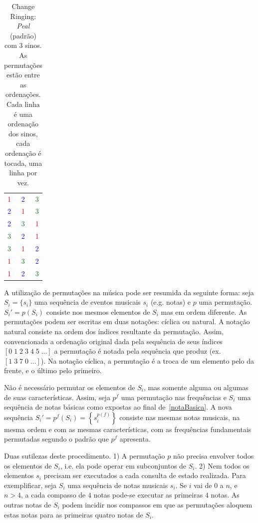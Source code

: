 \begin{table}[htpq!]
\centering
\caption{Change Ringing: \emph{Peal} (padrão) com 3 sinos. As permutações estão entre as ordenações. Cada linha é uma ordenação dos sinos, cada ordenação é tocada, uma linha por vez.}
\begin{tabular}{l c r}
\textcolor{red}{1} & \textcolor{blue}{2} & \textcolor{green}{3} \\
\textcolor{blue}{2} & \textcolor{red}{1} & \textcolor{green}{3} \\
\textcolor{blue}{2} & \textcolor{green}{3} & \textcolor{red}{1} \\
\textcolor{green}{3} & \textcolor{blue}{2} & \textcolor{red}{1} \\
\textcolor{green}{3} & \textcolor{red}{1} & \textcolor{blue}{2} \\
\textcolor{red}{1} & \textcolor{green}{3} & \textcolor{blue}{2} \\
\textcolor{red}{1} & \textcolor{blue}{2} & \textcolor{green}{3}
\end{tabular}
\label{tab:change}
\end{table}


A utilização de permutações na música pode ser resumida da seguinte forma:
seja $S_i=\{s_i\}$ uma sequência de eventos musicais $s_i$ (e.g. notas) e $p$ uma permutação.
$S_i'=p(S_i)$ consiste nos mesmos elementos de $S_i$ mas em ordem diferente.
As permutações podem ser escritas em duas notações: cíclica ou natural. 
A notação natural consiste na ordem dos índices 
resultante da permutação. Assim,
convencionada a ordenação original dada pela sequência de seus índices $[0\;1\;2\;3\;4\;5\;...]$ a permutação é notada pela sequência que produz (ex. $[1\;3\;7\;0\;...]$). Na notação cíclica, a permutação é a troca de um elemento pelo
da frente, e o último pelo primeiro.

Não é necessário permutar os elementos de $S_i$, mas somente
alguma ou algumas de suas características. Assim, seja $p^f$ uma permutação 
nas frequências e $S_i$ uma sequência de notas básicas como expostas
ao final de~\ref{notaBasica}. A nova sequência $S_i'=p^f(S_i)=\left\{s_i^{p(f)}\right\}$ consiste nas mesmas
notas musicais, na mesma ordem e com as mesmas características, com as frequências fundamentais permutadas segundo o padrão que $p^f$ apresenta.

Duas sutilezas deste procedimento.
1) A permutação $p$ não precisa envolver todos os elementos de $S_i$, i.e. ela
pode operar em subconjuntos de $S_i$. 2) Nem todos os elementos $s_i$ precisam ser executados a cada consulta de estado realizada.
Para exemplificar, seja $S_i$ 
uma sequência de notas musicais $s_i$. 
Se $i$ vai de $0$ a $n$, e $n>4$, a cada compasso
de $4$ notas pode-se executar as primeiras $4$ notas. As outras notas de
$S_i$ podem incidir nos compassos em que as permutações aloquem
estas notas para as primeiras quatro notas de $S_i$.

